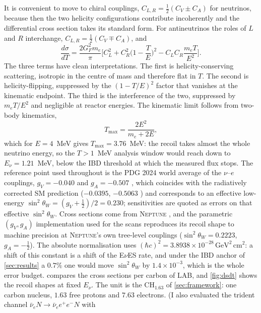 \documentclass[aps,prd,superscriptaddress,nofootinbib,longbibliography,notitlepage,11pt]{revtex4-2}
\newcommand{\eves}{E$\nu$ES}
\newcommand{\sw}{\sin^2\theta_W}
\begin{document}
It is convenient to move to chiral couplings, $C_{L,R}=\tfrac12(C_V\pm C_A)$ for neutrinos,
because then the two helicity configurations contribute incoherently and the differential
cross section takes its standard form.  For antineutrinos the roles of $L$ and $R$
interchange, $C_{L,R}=\tfrac12(C_V\mp C_A)$, and
\begin{equation}
\frac{d\sigma}{dT}=\frac{2G_F^2m_e}{\pi}\Big[C_L^2+C_R^2\Big(1-\frac{T}{E}\Big)^2
-C_LC_R\frac{m_eT}{E^2}\Big].
\label{eq:dsdT}
\end{equation}
The three terms have clean interpretations.  The first is helicity-conserving scattering,
isotropic in the centre of mass and therefore flat in $T$.  The second is
helicity-flipping, suppressed by the $(1-T/E)^2$ factor that vanishes at the kinematic
endpoint.  The third is the interference of the two, suppressed by $m_eT/E^2$ and
negligible at reactor energies.  The kinematic limit follows from two-body kinematics,
\begin{equation}
T_{\max}=\frac{2E^2}{m_e+2E},
\label{eq:tmax}
\end{equation}
which for $E=4$~MeV gives $T_{\max}=3.76$~MeV: the recoil takes almost the whole neutrino
energy, so the $T>1$~MeV analysis window would reach down to $E_\nu=1.21$~MeV, below the
IBD threshold at which the measured flux stops.  The reference point used throughout is the PDG 2024 world average of the $\nu$--$e$ couplings, $g_V=-0.040$ and
$g_A=-0.507$ \cite{ParticleDataGroup:2024cfk}, which coincides with the radiatively
corrected SM prediction ($-0.0395$, $-0.5063$ \cite{Erler:2004in}) and corresponds to an
effective low-energy $\sw=(g_V+\tfrac12)/2=0.230$; sensitivities are quoted as errors on
that effective $\sw$.  Cross sections come from \textsc{Neptune} \cite{NEPTUNE}, and the
parametric $(g_V,g_A)$ implementation used for the scans reproduces its recoil shape to
machine precision at \textsc{Neptune}'s own tree-level couplings ($\sw=0.2223$,
$g_A=-\tfrac12$).  The absolute normalisation uses
$(\hbar c)^2=3.8938\times10^{-28}\,\mathrm{GeV^2\,cm^2}$: a shift of this constant is a
shift of the \eves{} rate, and under the IBD anchor of \cref{sec:results} a $0.7\%$ one
would move $\sw$ by $1.4\times10^{-3}$, which is the whole error budget.   compares the cross sections per carbon of LAB, and
\cref{fig:dsdt} shows the recoil shapes at fixed $E_\nu$.  The unit is the CH$_{1.63}$ of
\cref{sec:framework}: one carbon nucleus, $1.63$ free protons and $7.63$ electrons.  (I also evaluated the trident channel $\bar\nu_eN\to\bar\nu_ee^+e^-N$ with
\end{document}
